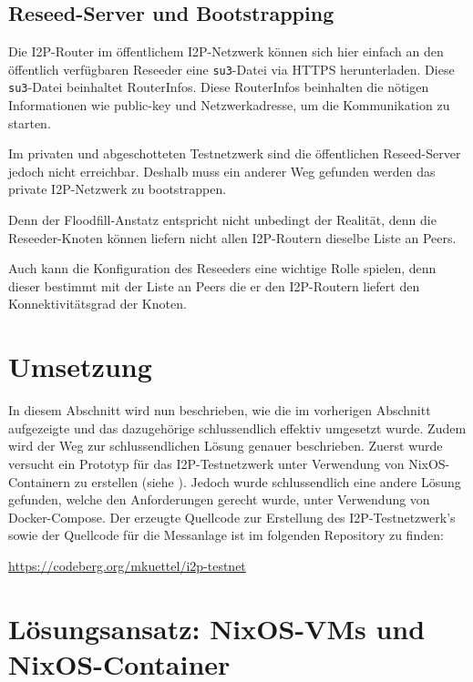 
\subsection{Reseed-Server und Bootstrapping}

Die I2P-Router im öffentlichem I2P-Netzwerk können sich hier einfach an den öffentlich verfügbaren Reseeder eine \lstinline|su3|-Datei via HTTPS herunterladen.
Diese \lstinline|su3|-Datei beinhaltet RouterInfos. 
Diese RouterInfos beinhalten die nötigen Informationen wie public-key und Netzwerkadresse, um die Kommunikation zu starten.

Im privaten und abgeschotteten Testnetzwerk sind die öffentlichen Reseed-Server jedoch nicht erreichbar.
Deshalb muss ein anderer Weg gefunden werden das private I2P-Netzwerk zu bootstrappen.

Denn der Floodfill-Anstatz entspricht nicht unbedingt der Realität, denn die Reseeder-Knoten können liefern nicht allen I2P-Routern dieselbe Liste an Peers.

Auch kann die Konfiguration des Reseeders eine wichtige Rolle spielen, denn dieser bestimmt mit der Liste an Peers die er den I2P-Routern liefert den Konnektivitätsgrad der Knoten.

\section{Umsetzung}\label{sec:umsetzung}

In diesem Abschnitt wird nun beschrieben,
wie die im vorherigen Abschnitt aufgezeigte  und das dazugehörige  schlussendlich effektiv umgesetzt wurde.
Zudem wird der Weg zur schlussendlichen Lösung genauer beschrieben.
Zuerst wurde versucht ein Prototyp für das I2P-Testnetzwerk unter Verwendung von NixOS-Containern zu erstellen (siehe ).
Jedoch wurde schlussendlich eine andere Lösung gefunden, welche den Anforderungen gerecht wurde, unter Verwendung von Docker-Compose.
Der erzeugte Quellcode zur Erstellung des I2P-Testnetzwerk's sowie der Quellcode für die Messanlage ist im folgenden Repository zu finden:

\url{https://codeberg.org/mkuettel/i2p-testnet}

\section{Lösungsansatz: NixOS-VMs und NixOS-Container}\label{sec:la1_nixos}

